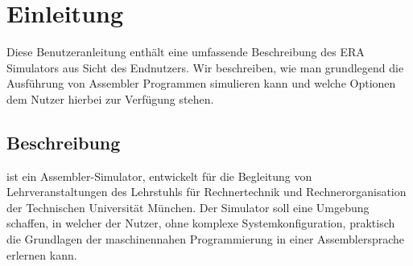 
\section{Einleitung}

Diese Benutzeranleitung enthält eine umfassende Beschreibung des ERA Simulators
aus Sicht des Endnutzers. Wir beschreiben, wie man grundlegend die Ausführung
von Assembler Programmen simulieren kann und welche Optionen dem Nutzer hierbei
zur Verfügung stehen.

\subsection{Beschreibung}

\erasim{} ist ein Assembler-Simulator, entwickelt für die Begleitung von
Lehrveranstaltungen des Lehrstuhls für Rechnertechnik und Rechnerorganisation
der Technischen Universität München. Der Simulator soll eine Umgebung schaffen,
in welcher der Nutzer, ohne komplexe Systemkonfiguration, praktisch die
Grundlagen der maschinennahen Programmierung in einer Assemblersprache erlernen
kann.

